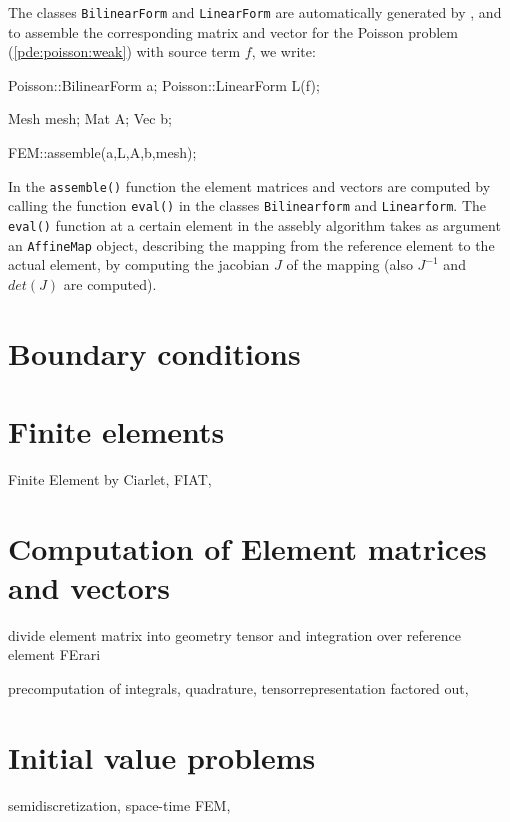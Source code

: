 The classes \texttt{BilinearForm} and \texttt{LinearForm} are automatically 
generated by \ffc{}, and to assemble the corresponding matrix and vector for 
the Poisson problem (\ref{pde:poisson:weak}) with source term $f$, we write:  
\begin{code}
Poisson::BilinearForm a;
Poisson::LinearForm L(f);

Mesh mesh; 
Mat A;
Vec b;

FEM::assemble(a,L,A,b,mesh);
\end{code}

In the \texttt{assemble()} function the element matrices and vectors are 
computed by calling the function \texttt{eval()} in the classes 
\texttt{Bilinearform} and \texttt{Linearform}. 
The \texttt{eval()} function at a certain element in the assebly algorithm 
takes as argument an \texttt{AffineMap} object, 
describing the mapping from the reference element to the actual element, 
by computing the jacobian $J$ of the mapping (also $J^{-1}$ and $det(J)$ 
are computed).  

\section{Boundary conditions}

\section{Finite elements}

Finite Element by Ciarlet, FIAT, \ffc{}  

\section{Computation of Element matrices and vectors} 

divide element matrix into geometry tensor and integration 
over reference element FErari

precomputation of integrals, quadrature, tensorrepresentation factored out, \ffc{} 

\section{Initial value problems}

semidiscretization, space-time FEM, 

